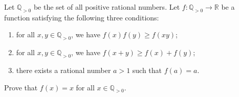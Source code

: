 Let $\mathbb{Q}_{>0}$ be the set of all positive rational numbers.
Let $f:\mathbb{Q}_{>0} \to \mathbb{R}$ be a function satisfying the following three conditions:

\begin{enumerate}[label = (\roman*)]
	\item for all 
		$x, y \in \mathbb{Q}_{>0}$, we have $f(x)f(y)\geq f(xy)$;

	\item for all $x, y \in \mathbb{Q}_{>0}$, we have $f(x+y)\geq f(x) + f(y)$;

	\item there exists a rational number $a>1$ such that $f(a)=a$.
\end{enumerate}

Prove that $f(x) = x$ for all $x \in \mathbb{Q}_{>0}$.
